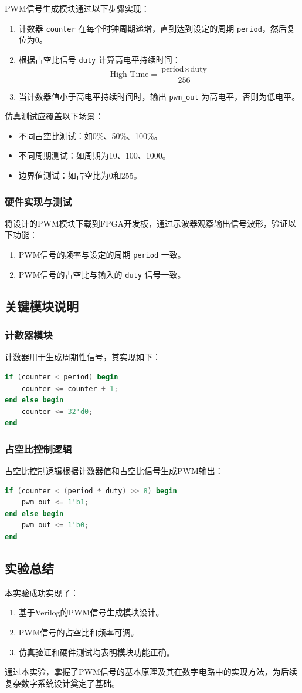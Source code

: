 \documentclass[12pt,hyperref,a4paper,UTF8]{ctexart}
\begin{document}
PWM信号生成模块通过以下步骤实现：
\begin{enumerate}
    \item 计数器 \texttt{counter} 在每个时钟周期递增，直到达到设定的周期 \texttt{period}，然后复位为0。
    \item 根据占空比信号 \texttt{duty} 计算高电平持续时间：
    \[
    \text{High\_Time} = \frac{\text{period} \times \text{duty}}{256}
    \]
    \item 当计数器值小于高电平持续时间时，输出 \texttt{pwm\_out} 为高电平，否则为低电平。
\end{enumerate}

仿真测试应覆盖以下场景：
\begin{itemize}
    \item 不同占空比测试：如0\%、50\%、100\%。
    \item 不同周期测试：如周期为10、100、1000。
    \item 边界值测试：如占空比为0和255。
\end{itemize}

\subsubsection{硬件实现与测试}
将设计的PWM模块下载到FPGA开发板，通过示波器观察输出信号波形，验证以下功能：
\begin{enumerate}
    \item PWM信号的频率与设定的周期 \texttt{period} 一致。
    \item PWM信号的占空比与输入的 \texttt{duty} 信号一致。
\end{enumerate}

\subsection{关键模块说明}
\subsubsection{计数器模块}
计数器用于生成周期性信号，其实现如下：
\begin{lstlisting}[language=Verilog]
if (counter < period) begin
    counter <= counter + 1;
end else begin
    counter <= 32'd0;
end
\end{lstlisting}

\subsubsection{占空比控制逻辑}
占空比控制逻辑根据计数器值和占空比信号生成PWM输出：
\begin{lstlisting}[language=Verilog]
if (counter < (period * duty) >> 8) begin
    pwm_out <= 1'b1;
end else begin
    pwm_out <= 1'b0;
end
\end{lstlisting}

\subsection{实验总结}
本实验成功实现了：
\begin{enumerate}
    \item 基于Verilog的PWM信号生成模块设计。
    \item PWM信号的占空比和频率可调。
    \item 仿真验证和硬件测试均表明模块功能正确。
\end{enumerate}

通过本实验，掌握了PWM信号的基本原理及其在数字电路中的实现方法，为后续复杂数字系统设计奠定了基础。
\end{document}
